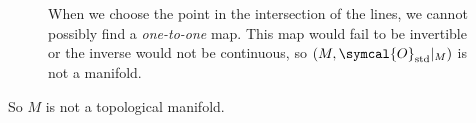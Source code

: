 \begin{figure}[ht]
  \caption{When we choose the point in the intersection of the lines, we cannot possibly find
    a \emph{one-to-one} map. This map would fail to be invertible or the inverse would not be
    continuous, so $(M,\symcal{O}_{\text{std}}|_M)$ is not a manifold.}
  \label{fig:mf-three-lines-wrong-map}
\end{figure}

So $M$ is not a topological manifold.

